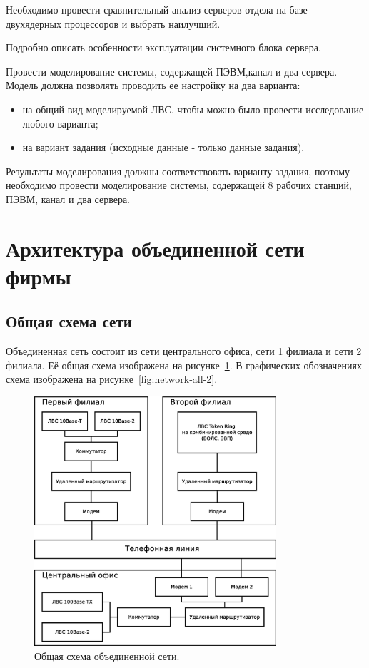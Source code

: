 \documentclass[russian,utf8,emptystyle]{eskdtext}
\begin{document}
Необходимо провести сравнительный анализ серверов отдела на базе двухядерных процессоров  и выбрать наилучший.

Подробно описать особенности эксплуатации  системного блока сервера.

Провести моделирование системы, содержащей ПЭВМ,канал и два сервера. Модель должна позволять проводить ее настройку на два варианта:
\begin{itemize}
\item на общий вид моделируемой ЛВС, чтобы можно было провести исследование любого варианта;
\item на вариант задания (исходные данные - только данные задания). 
\end{itemize}

Результаты моделирования должны соответствовать варианту задания, поэтому  необходимо провести  моделирование системы, содержащей 8 рабочих станций, ПЭВМ, канал и два сервера.

\clearpage
\section{Архитектура объединенной сети фирмы}
\subsection{Общая схема сети}
Объединенная сеть состоит из сети центрального офиса, сети 1 филиала и сети 2 филиала. Её общая схема изображена на рисунке~\ref{fig:network-all}. В графических обозначениях схема изображена на рисунке~\ref{fig:network-all-2}.

\begin{figure}[h!]
\centering
\includegraphics[width = 0.8\textwidth]{network-all}
\caption{Общая схема объединенной сети.}
\label{fig:network-all}
\end{figure}
\end{document}
